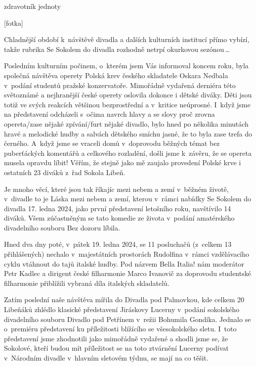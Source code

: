 \documentclass[11pt]{article}
\begin{document}
\signature{Vít Jakoubek}{zdravotník jednoty}

{\color{sokolred}[fotka]}
\clearpage

Chladnější období k~návštěvě divadla a dalších kulturních institucí přímo vybízí, takže rubrika \luv{}Se Sokolem do divadla\ruv{} rozhodně netrpí okurkovou sezónou\,\dots{}

Posledním kulturním počinem, o~kterém jsem Vás informoval koncem roku, byla společná návštěva operety Polská krev českého skladatele Oskara Nedbala v~podání studentů pražské konzervatoře. Mimořádně vydařená derniéra této světoznámé a nejhranější české operety oslovila dokonce i dětské diváky. Děti jsou totiž ve svých reakcích většinou bezprostřední a v~kritice neúprosné. I~když jsme na představení odcházeli s~očima navrch hlavy a se slovy \luv{}proč zrovna opereta/zase nějaké zpívání/furt nějaké divadlo\ruv{}, bylo hned po několika minutách hravé a melodické hudby a salvách dětského smíchu jasné, že to byla \luv{}zase trefa do černého\ruv{}. A~když jsme se vraceli domů v~doprovodu běžných témat \luv{}bez puberťáckých komentářů a celkového rozladění\ruv{}, došli jsme k~závěru, že se opereta musela opravdu líbit! Věřím, že stejně jako mě zaujalo provedení Polské krve i ostatních 23 diváků z~řad Sokola Libeň.

Je mnoho věcí, které jsou tak říkajíc \luv{}mezi nebem a zemí\ruv{} v~běžném životě, v~divadle to je \luv{}Láska mezi nebem a zemí\ruv{}, kterou v~rámci nabídky \luv{}Se Sokolem do divadla\ruv{} 17. ledna 2024, jako první představení letošního roku, navštívilo 14 diváků. Všem zúčastněným se tato komedie \luv{}ze života\ruv{} v~podání amatérského divadelního souboru Bez dozoru líbila.

Hned dva dny poté, v~pátek 19. ledna 2024, se 11 posluchačů (z~celkem 13 přihlášených) nechalo v~majestátních prostorách Rudolfina v~rámci vzdělávacího cyklu vtáhnout do tajů italské hudby. Pod názvem \luv{}Bella Italia!\ruv{} nám moderátor Petr Kadlec a dirigent české filharmonie Marco Ivanovič za doprovodu studentské filharmonie přiblížili vybraná díla italských skladatelů.

Zatím poslední naše návštěva mířila do Divadla pod Palmovkou, kde celkem 20 \luv{}Libeňáků\ruv{} zhlédlo klasické představení Jiráskovy Lucerny v~podání sokolského divadelního souboru \luv{}Divadlo pod Petřínem\ruv{} v~režii Bohumila Gondíka. Jednalo se o~premiéru představení ku příležitosti blížícího se všesokolského sletu. I~toto představení jsme zhodnotili jako mimořádně vydařené a shodli jsme se, že Sokolové, kteří budou mít příležitost se na toto ztvárnění Lucerny podívat v~Národním divadle v~hlavním sletovém týdnu, se mají na co těšit.
\end{document}
